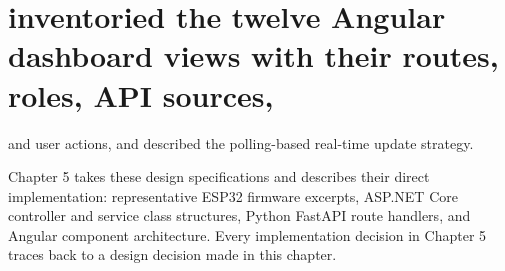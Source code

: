 \section{inventoried the twelve Angular dashboard views with their routes, roles, API sources,}

and user actions, and described the polling-based real-time update strategy.

Chapter 5 takes these design specifications and describes their direct implementation:
representative ESP32 firmware excerpts, ASP.NET Core controller and service class
structures, Python FastAPI route handlers, and Angular component architecture. Every
implementation decision in Chapter 5 traces back to a design decision made in this
chapter.




